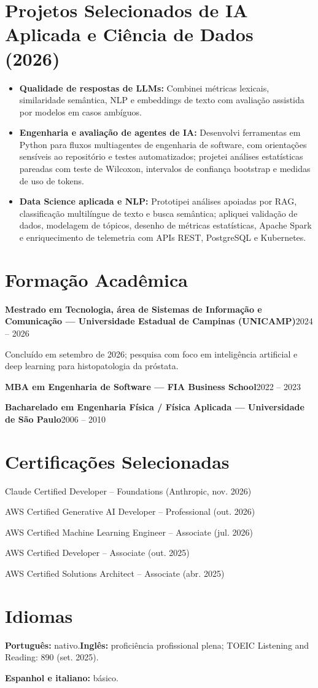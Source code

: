 \documentclass[10pt,a4paper]{article}
\begin{document}
\section{Projetos Selecionados de IA Aplicada e Ciência de Dados (2026)}
\begin{itemize}
  \item \textbf{Qualidade de respostas de LLMs:} Combinei métricas lexicais, similaridade semântica, NLP e embeddings de texto com avaliação assistida por modelos em casos ambíguos.
  \item \textbf{Engenharia e avaliação de agentes de IA:} Desenvolvi ferramentas em Python para fluxos multiagentes de engenharia de software, com orientações sensíveis ao repositório e testes automatizados; projetei análises estatísticas pareadas com teste de Wilcoxon, intervalos de confiança bootstrap e medidas de uso de tokens.
  \item \textbf{Data Science aplicada e NLP:} Prototipei análises apoiadas por RAG, classificação multilíngue de texto e busca semântica; apliquei validação de dados, modelagem de tópicos, desenho de métricas estatísticas, Apache Spark e enriquecimento de telemetria com APIs REST, PostgreSQL e Kubernetes.
\end{itemize}

\section{Formação Acadêmica}
\textbf{Mestrado em Tecnologia, área de Sistemas de Informação e Comunicação --- Universidade Estadual de Campinas (UNICAMP)}\hfill {\small 2024 -- 2026}\par
Concluído em setembro de 2026; pesquisa com foco em inteligência artificial e deep learning para histopatologia da próstata.\par
\textbf{MBA em Engenharia de Software --- FIA Business School}\hfill {\small 2022 -- 2023}\par
\textbf{Bacharelado em Engenharia Física / Física Aplicada --- Universidade de São Paulo}\hfill {\small 2006 -- 2010}\par

\section{Certificações Selecionadas}
Claude Certified Developer -- Foundations (Anthropic, nov. 2026)\par
AWS Certified Generative AI Developer -- Professional (out. 2026)\par
AWS Certified Machine Learning Engineer -- Associate (jul. 2026)\par
AWS Certified Developer -- Associate (out. 2025)\par
AWS Certified Solutions Architect -- Associate (abr. 2025)

\section{Idiomas}
\textbf{Português:} nativo.\quad\textbf{Inglês:} proficiência profissional plena; TOEIC Listening and Reading: 890 (set. 2025).\par
\textbf{Espanhol e italiano:} básico.
\end{document}
